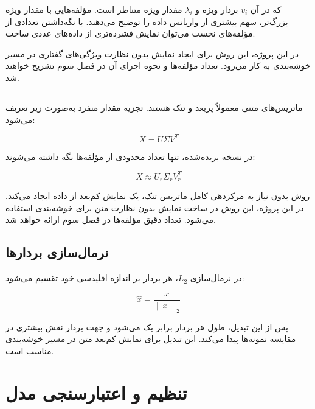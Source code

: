 که در آن $v_i$ بردار ویژه و $\lambda_i$ مقدار ویژه متناظر است. مؤلفه‌هایی با مقدار ویژه بزرگ‌تر، سهم بیشتری از واریانس داده را توضیح می‌دهند. با نگه‌داشتن تعدادی از مؤلفه‌های نخست می‌توان نمایش فشرده‌تری از داده‌های عددی ساخت.

در این پروژه، این روش برای ایجاد نمایش بدون نظارت ویژگی‌های گفتاری در مسیر خوشه‌بندی به کار می‌رود. تعداد مؤلفه‌ها و نحوه اجرای آن در فصل سوم تشریح خواهند شد.


\subsection{}

ماتریس‌های متنی
معمولاً پربعد و تنک هستند. تجزیه مقدار منفرد به‌صورت زیر تعریف می‌شود:

\begin{equation}
X
=
U\Sigma V^T
\end{equation}

در نسخه بریده‌شده، تنها تعداد محدودی از مؤلفه‌ها نگه داشته می‌شوند:

\begin{equation}
X
\approx
U_r\Sigma_rV_r^T
\end{equation}

روش
بدون نیاز به مرکزدهی کامل ماتریس تنک، یک نمایش کم‌بعد از داده ایجاد می‌کند. در این پروژه، این روش در ساخت نمایش بدون نظارت متن برای خوشه‌بندی استفاده می‌شود. تعداد دقیق مؤلفه‌ها در فصل سوم ارائه خواهد شد.


\subsection{نرمال‌سازی بردارها}

در نرمال‌سازی
$L_2$،
هر بردار بر اندازه اقلیدسی خود تقسیم می‌شود:

\begin{equation}
\hat{x}
=
\frac{x}{\left\|x\right\|_2}
\end{equation}

پس از این تبدیل، طول هر بردار برابر یک می‌شود و جهت بردار نقش بیشتری در مقایسه نمونه‌ها پیدا می‌کند. این تبدیل برای نمایش کم‌بعد متن در مسیر خوشه‌بندی مناسب است.


\section{تنظیم و اعتبارسنجی مدل}

